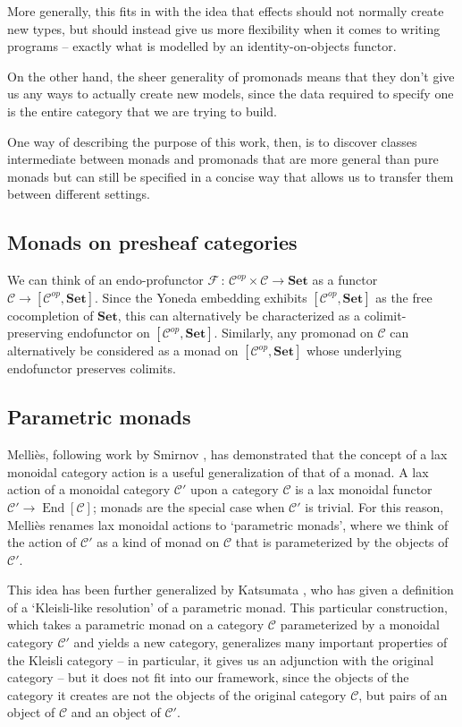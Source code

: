 \documentclass{svproc}
\newcommand\C{\mathcal{C}}
\newcommand\F{\mathcal{F}}
\newcommand\from{\,\colon\,}
\DeclareMathOperator{\End}{End}
\newcommand\Mellies{Melli\`{e}s\xspace}
\newcommand{\catname}[1]{\mathbf{#1}}
\newcommand{\Set}{\catname{Set}}
\begin{document}
More generally, this fits in with the idea that effects should not normally create new types, but should instead give us more flexibility when it comes to writing programs -- exactly what is modelled by an identity-on-objects functor.

On the other hand, the sheer generality of promonads means that they don't give us any ways to actually create new models, since the data required to specify one is the entire category that we are trying to build.

One way of describing the purpose of this work, then, is to discover classes intermediate between monads and promonads that are more general than pure monads but can still be specified in a concise way that allows us to transfer them between different settings.

\subsection{Monads on presheaf categories}

We can think of an endo-profunctor $\F\from \C^{op}\times\C\to \Set$ as a functor $\C\to [\C^{op},\Set]$.  
Since the Yoneda embedding exhibits $[\C^{op},\Set]$ as the free cocompletion of $\Set$, this can alternatively be characterized as a colimit-preserving endofunctor on $[\C^{op},\Set]$.  
Similarly, any promonad on $\C$ can alternatively be considered as a monad on $[\C^{op},\Set]$ whose underlying endofunctor preserves colimits.

\subsection{Parametric monads}

\Mellies \cite{ParametricMonads}, following work by Smirnov \cite{Smirnov2008}, has demonstrated that the concept of a lax monoidal category action is a useful generalization of that of a monad.  
A lax action of a monoidal category $\C'$ upon a category $\C$ is a lax monoidal functor $\C'\to \End[\C]$; monads are the special case when $\C'$ is trivial.  
For this reason, \Mellies renames lax monoidal actions to `parametric monads', where we think of the action of $\C'$ as a kind of monad on $\C$ that is parameterized by the objects of $\C'$.

This idea has been further generalized by Katsumata \cite{Katsu}, who has given a definition of a `Kleisli-like resolution' of a parametric monad.  
This particular construction, which takes a parametric monad on a category $\C$ parameterized by a monoidal category $\C'$ and yields a new category, generalizes many important properties of the Kleisli category -- in particular, it gives us an adjunction with the original category -- but it does not fit into our framework, since the objects of the category it creates are not the objects of the original category $\C$, but pairs of an object of $\C$ and an object of $\C'$.
\end{document}
